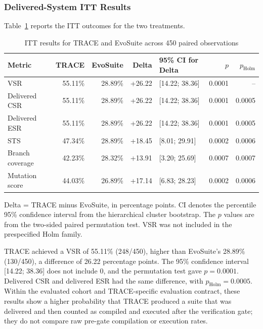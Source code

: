 \documentclass[pdflatex,sn-basic,Numbered,iicol]{sn-jnl}
\begin{document}
\subsubsection{Delivered-System ITT Results}\label{subsubsec:trace-itt}

Table~\ref{tab:trace-itt} reports the ITT outcomes for the two treatments.

\begin{table}[htbp]
\caption{ITT results for TRACE and EvoSuite across 450 paired observations}\label{tab:trace-itt}
\centering
\scriptsize
\begin{tabularx}{\textwidth}{@{}>{\raggedright\arraybackslash}X r r r l r r@{}}
\toprule
Metric & TRACE & EvoSuite & Delta & 95\% CI for Delta & $p$ & $p_{\mathrm{Holm}}$ \\
\midrule
VSR & 55.11\% & 28.89\% & +26.22 & [14.22; 38.36] & 0.0001 & -- \\
Delivered CSR & 55.11\% & 28.89\% & +26.22 & [14.22; 38.36] & 0.0001 & 0.0005 \\
Delivered ESR & 55.11\% & 28.89\% & +26.22 & [14.22; 38.36] & 0.0001 & 0.0005 \\
STS & 47.34\% & 28.89\% & +18.45 & [8.01; 29.91] & 0.0002 & 0.0006 \\
Branch coverage & 42.23\% & 28.32\% & +13.91 & [3.20; 25.69] & 0.0007 & 0.0007 \\
Mutation score & 44.03\% & 26.89\% & +17.14 & [6.83; 28.23] & 0.0002 & 0.0006 \\
\bottomrule
\end{tabularx}
\begin{tablenotes}
\item Delta = TRACE minus EvoSuite, in percentage points. CI denotes the percentile 95\% confidence interval from the hierarchical cluster bootstrap. The $p$ values are from the two-sided paired permutation test. VSR was not included in the prespecified Holm family.
\end{tablenotes}
\end{table}

TRACE achieved a VSR of 55.11\% (248/450), higher than EvoSuite's 28.89\% (130/450), a difference of 26.22 percentage points. The 95\% confidence interval [14.22; 38.36] does not include 0, and the permutation test gave $p=0.0001$. Delivered CSR and delivered ESR had the same difference, with $p_{\mathrm{Holm}}=0.0005$. Within the evaluated cohort and TRACE-specific evaluation contract, these results show a higher probability that TRACE produced a suite that was delivered and then counted as compiled and executed after the verification gate; they do not compare raw pre-gate compilation or execution rates.
\end{document}
